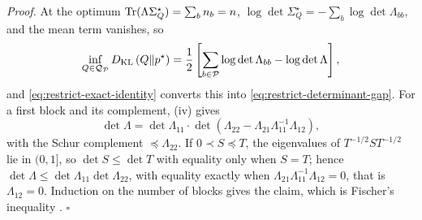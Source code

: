 \noindent\emph{Proof.}
At the optimum \(\operatorname{Tr}(\Lambda\Sigma_Q^\star)=\sum_bn_b=n\),
\(\log\det\Sigma_Q^\star=-\sum_b\log\det\Lambda_{bb}\), and the mean term
vanishes, so
\begin{equation}
\inf_{Q\in\mathcal Q_{\mathcal P}}D_{\mathrm{KL}}\left(Q\Vert p^\star\right)
=\frac12\left[\sum_{b\in\mathcal P}\log\det\Lambda_{bb}-\log\det\Lambda\right],
\label{eq:restrict-block-min-kl}
\end{equation}
and \eqref{eq:restrict-exact-identity} converts this into
\eqref{eq:restrict-determinant-gap}. For a first block and its complement,
(iv) gives
\begin{equation}
\det\Lambda=\det\Lambda_{11}\cdot\det\left(\Lambda_{22}-\Lambda_{21}\Lambda_{11}^{-1}\Lambda_{12}\right),
\label{eq:restrict-schur-determinant}
\end{equation}
with the Schur complement \(\preceq\Lambda_{22}\). If \(0\prec S\preceq T\), the
eigenvalues of \(T^{-1/2}ST^{-1/2}\) lie in \((0,1]\), so \(\det S\leq\det T\)
with equality only when \(S=T\); hence
\(\det\Lambda\leq\det\Lambda_{11}\det\Lambda_{22}\), with equality exactly when
\(\Lambda_{21}\Lambda_{11}^{-1}\Lambda_{12}=0\), that is \(\Lambda_{12}=0\).
Induction on the number of blocks gives the claim, which is Fischer's
inequality \citep[\S7.8]{HornJohnson2013}. \(\square\)

